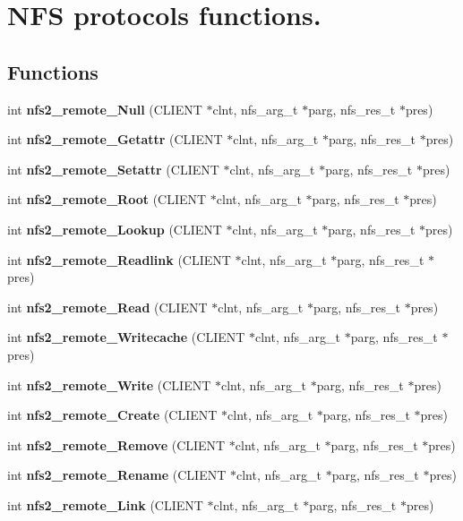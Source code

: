\section{NFS protocols functions.}
\label{group__NFSprocs}
\subsection*{Functions}
\begin{DoxyCompactItemize}
\item 
int {\bf nfs2\_\-remote\_\-Null} (CLIENT $\ast$clnt, nfs\_\-arg\_\-t $\ast$parg, nfs\_\-res\_\-t $\ast$pres)
\item 
int {\bf nfs2\_\-remote\_\-Getattr} (CLIENT $\ast$clnt, nfs\_\-arg\_\-t $\ast$parg, nfs\_\-res\_\-t $\ast$pres)
\item 
int {\bf nfs2\_\-remote\_\-Setattr} (CLIENT $\ast$clnt, nfs\_\-arg\_\-t $\ast$parg, nfs\_\-res\_\-t $\ast$pres)
\item 
int {\bf nfs2\_\-remote\_\-Root} (CLIENT $\ast$clnt, nfs\_\-arg\_\-t $\ast$parg, nfs\_\-res\_\-t $\ast$pres)
\item 
int {\bf nfs2\_\-remote\_\-Lookup} (CLIENT $\ast$clnt, nfs\_\-arg\_\-t $\ast$parg, nfs\_\-res\_\-t $\ast$pres)
\item 
int {\bf nfs2\_\-remote\_\-Readlink} (CLIENT $\ast$clnt, nfs\_\-arg\_\-t $\ast$parg, nfs\_\-res\_\-t $\ast$pres)
\item 
int {\bf nfs2\_\-remote\_\-Read} (CLIENT $\ast$clnt, nfs\_\-arg\_\-t $\ast$parg, nfs\_\-res\_\-t $\ast$pres)
\item 
int {\bf nfs2\_\-remote\_\-Writecache} (CLIENT $\ast$clnt, nfs\_\-arg\_\-t $\ast$parg, nfs\_\-res\_\-t $\ast$pres)
\item 
int {\bf nfs2\_\-remote\_\-Write} (CLIENT $\ast$clnt, nfs\_\-arg\_\-t $\ast$parg, nfs\_\-res\_\-t $\ast$pres)
\item 
int {\bf nfs2\_\-remote\_\-Create} (CLIENT $\ast$clnt, nfs\_\-arg\_\-t $\ast$parg, nfs\_\-res\_\-t $\ast$pres)
\item 
int {\bf nfs2\_\-remote\_\-Remove} (CLIENT $\ast$clnt, nfs\_\-arg\_\-t $\ast$parg, nfs\_\-res\_\-t $\ast$pres)
\item 
int {\bf nfs2\_\-remote\_\-Rename} (CLIENT $\ast$clnt, nfs\_\-arg\_\-t $\ast$parg, nfs\_\-res\_\-t $\ast$pres)
\item 
int {\bf nfs2\_\-remote\_\-Link} (CLIENT $\ast$clnt, nfs\_\-arg\_\-t $\ast$parg, nfs\_\-res\_\-t $\ast$pres)
\item 

\end{DoxyCompactItemize}
